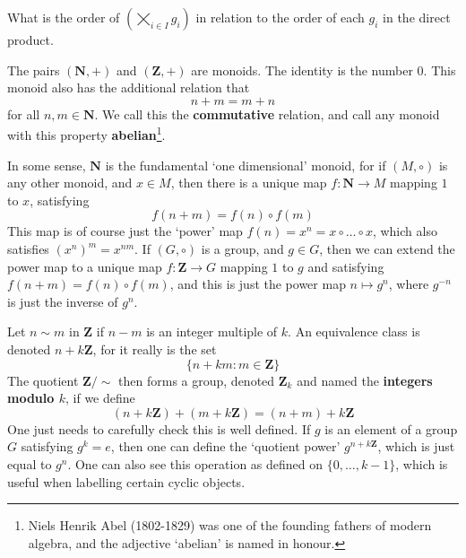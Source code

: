 \clearpage

\begin{exercise}
    What is the order of $(\bigtimes_{i \in I} g_i)$ in relation to the order of each $g_i$ in the direct product.
\end{exercise}




















\begin{example}
    The pairs  $(\mathbf{N}, +)$ and $(\mathbf{Z}, +)$ are monoids. The identity is the number $0$. This monoid also has the additional relation that
    \[ n + m = m + n \]
    for all $n,m \in \mathbf{N}$. We call this the {\bf commutative} relation, and call any monoid with this property {\bf abelian}\footnote{Niels Henrik Abel (1802-1829) was one of the founding fathers of modern algebra, and the adjective `abelian' is named in honour.}.
\end{example}

In some sense, $\mathbf{N}$ is the fundamental `one dimensional' monoid, for if $(M, \circ)$ is any other monoid, and $x \in M$, then there is a unique map $f: \mathbf{N} \to M$ mapping $1$ to $x$, satisfying
%
\[ f(n + m) = f(n) \circ f(m) \]
%
This map is of course just the `power' map $f(n) = x^n = x \circ \dots \circ x$, which also satisfies $(x^n)^m = x^{nm}$. If $(G, \circ)$ is a group, and $g \in G$, then we can extend the power map to a unique map $f: \mathbf{Z} \to G$ mapping $1$ to $g$ and satisfying $f(n + m) = f(n) \circ f(m)$, and this is just the power map $n \mapsto g^n$, where $g^{-n}$ is just the inverse of $g^n$.

\begin{example}
    Let $n \sim m$ in $\mathbf{Z}$ if $n - m$ is an integer multiple of $k$. An equivalence class is denoted $n + k \mathbf{Z}$, for it really is the set
    \[ \{ n + k m : m \in \mathbf{Z} \} \]
    The quotient $\mathbf{Z} / {\sim}$ then forms a group, denoted $\mathbf{Z}_k$ and named the {\bf integers modulo $k$}, if we define
    \[ (n + k \mathbf{Z}) + (m + k \mathbf{Z}) = (n + m) + k \mathbf{Z} \]
    One just needs to carefully check this is well defined. If $g$ is an element of a group $G$ satisfying $g^k = e$, then one can define the `quotient power' $g^{n + k \mathbf{Z}}$, which is just equal to $g^n$. One can also see this operation as defined on $\{ 0, \dots, k-1 \}$, which is useful when labelling certain cyclic objects.
\end{example}

